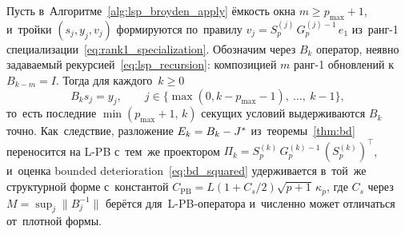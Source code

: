 \begin{proposition}
\label{prop:lpb_secant_retention}
Пусть в~Алгоритме~\ref{alg:lsp_broyden_apply} ёмкость окна
$m\ge p_{\max}+1$, и~тройки $(s_j,y_j,v_j)$ формируются по~правилу
$v_j = S_p^{(j)}\,G_p^{(j)-1}\,e_1$ из~ранг-1 специализации~\eqref{eq:rank1_specialization}.
Обозначим через $B_k$ оператор, неявно задаваемый рекурсией~\eqref{eq:lsp_recursion}:
композицией $m$ ранг-1 обновлений к~$B_{k-m}=I$. Тогда для каждого~$k\ge 0$
\begin{equation}\label{eq:lpb_secant_inv}
   B_k s_j = y_j,
   \qquad j \in \{\max(0,k-p_{\max}-1),\ \ldots,\ k-1\},
\end{equation}
то~есть последние $\min(p_{\max}+1,\,k)$ секущих условий
выдерживаются $B_k$ точно. Как~следствие, разложение
$E_k = B_k - J^{*}$ из~теоремы~\ref{thm:bd} переносится на L-PB
с~тем~же проектором $\Pi_k = S_p^{(k)}\,G_p^{(k)-1}\,(S_p^{(k)})^\top$,
и~оценка bounded deterioration~\eqref{eq:bd_squared} удерживается
в~той~же структурной форме с~константой
$C_{\mathrm{PB}} = L(1+C_s/2)\sqrt{p+1}\,\kappa_p$, где $C_s$ через
$M = \sup_j\|B_j^{-1}\|$ берётся для~L-PB-оператора и~численно может
отличаться от~плотной формы.
\end{proposition}

